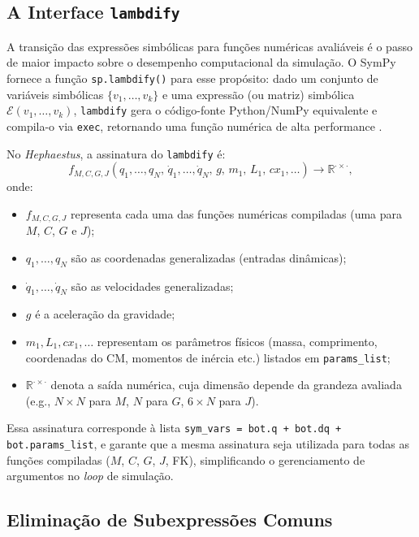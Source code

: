 \subsection{A Interface \texttt{lambdify}}

A transição das expressões simbólicas para funções numéricas avaliáveis é o passo de maior impacto sobre o desempenho computacional da simulação. O SymPy fornece a função \texttt{sp.lambdify()} para esse propósito: dado um conjunto de variáveis simbólicas $\{v_1, \ldots, v_k\}$ e uma expressão (ou matriz) simbólica $\mathcal{E}(v_1,\ldots,v_k)$, \texttt{lambdify} gera o código-fonte Python/NumPy equivalente e compila-o via \texttt{exec}, retornando uma função numérica de alta performance \cite{meurer2017sympy}.

No \textit{Hephaestus}, a assinatura do \texttt{lambdify} é:
\begin{equation}
    f_{M,C,G,J}(q_1,\ldots,q_N,\,\dot{q}_1,\ldots,\dot{q}_N,\,g,\,m_1,\,L_1,\,cx_1,\ldots) \to \mathbb{R}^{\cdot \times \cdot},
    \label{eq:lambdify_signature}
\end{equation}
onde:
\begin{itemize}
    \item $f_{M,C,G,J}$ representa cada uma das funções numéricas compiladas (uma para $M$, $C$, $G$ e $J$);
    \item $q_1, \ldots, q_N$ são as coordenadas generalizadas (entradas dinâmicas);
    \item $\dot{q}_1, \ldots, \dot{q}_N$ são as velocidades generalizadas;
    \item $g$ é a aceleração da gravidade;
    \item $m_1, L_1, cx_1, \ldots$ representam os parâmetros físicos (massa, comprimento, coordenadas do CM, momentos de inércia etc.) listados em \texttt{params\_list};
    \item $\mathbb{R}^{\cdot \times \cdot}$ denota a saída numérica, cuja dimensão depende da grandeza avaliada (e.g., $N\times N$ para $M$, $N$ para $G$, $6\times N$ para $J$).
\end{itemize}
Essa assinatura corresponde à lista \texttt{sym\_vars = bot.q + bot.dq + bot.params\_list}, e garante que a mesma assinatura seja utilizada para todas as funções compiladas ($M$, $C$, $G$, $J$, FK), simplificando o gerenciamento de argumentos no \textit{loop} de simulação.

\subsection{Eliminação de Subexpressões Comuns}

